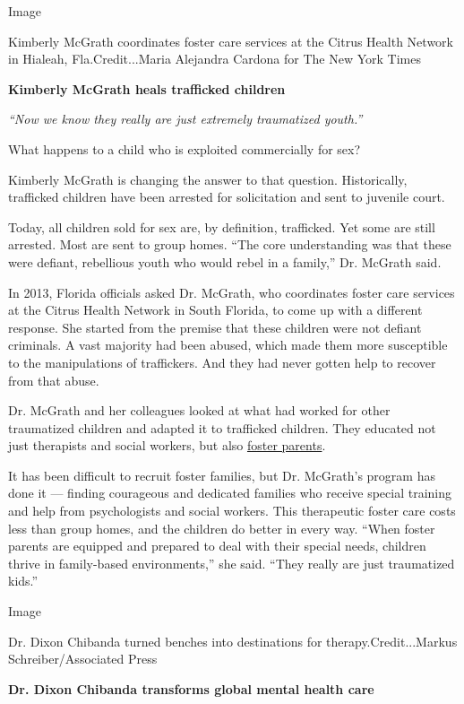 Image

Kimberly McGrath coordinates foster care services at the Citrus Health
Network in Hialeah, Fla.Credit...Maria Alejandra Cardona for The New
York Times

\textbf{Kimberly McGrath heals trafficked children}

\emph{``Now we know they really are just extremely traumatized youth.''}

What happens to a child who is exploited commercially for sex?

Kimberly McGrath is changing the answer to that question. Historically,
trafficked children have been arrested for solicitation and sent to
juvenile court.

Today, all children sold for sex are, by definition, trafficked. Yet
some are still arrested. Most are sent to group homes. ``The core
understanding was that these were defiant, rebellious youth who would
rebel in a family,'' Dr. McGrath said.

In 2013, Florida officials asked Dr. McGrath, who coordinates foster
care services at the Citrus Health Network in South Florida, to come up
with a different response. She started from the premise that these
children were not defiant criminals. A vast majority had been abused,
which made them more susceptible to the manipulations of traffickers.
And they had never gotten help to recover from that abuse.

Dr. McGrath and her colleagues looked at what had worked for other
traumatized children and adapted it to trafficked children. They
educated not just therapists and social workers, but also
\href{https://www.nytimes3xbfgragh.onion/2019/06/19/opinion/foster-child-trafficking.html}{foster
parents}.

It has been difficult to recruit foster families, but Dr. McGrath's
program has done it --- finding courageous and dedicated families who
receive special training and help from psychologists and social workers.
This therapeutic foster care costs less than group homes, and the
children do better in every way. ``When foster parents are equipped and
prepared to deal with their special needs, children thrive in
family-based environments,'' she said. ``They really are just
traumatized kids.''

Image

Dr. Dixon Chibanda turned benches into destinations for
therapy.Credit...Markus Schreiber/Associated Press

\textbf{Dr. Dixon Chibanda transforms global mental health care}

